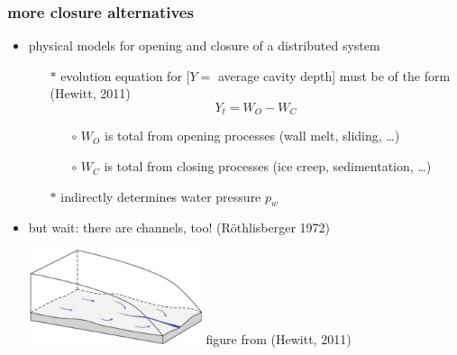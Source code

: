 \documentclass[hide notes,intlimits]{beamer}
\begin{document}
\begin{frame}
  \frametitle{more closure alternatives}

      \begin{itemize}
      \item physical models for opening and closure of a distributed system
        \begin{itemize}
        \item[$\ast$]  evolution equation for [$Y=$ average cavity depth] must be of the form (Hewitt, 2011)
        $$Y_t = W_O - W_C$$
          \begin{itemize}
          \vspace{-4mm}
          \item[$\circ$] $W_O$ is total from opening processes (wall melt, sliding, \dots)
          \item[$\circ$] $W_C$ is total from closing processes (ice creep, sedimentation, \dots)
          \end{itemize}
        \item[$\ast$] indirectly determines water pressure $p_w$
        \end{itemize}
      
      \bigskip
      \item but wait: there are channels, too! (R\"othlisberger 1972)

\begin{center}
\medskip
\includegraphics[width=0.4\textwidth]{figs/hewitt-cartoon} \tiny figure from (Hewitt, 2011)
\medskip
\end{center}
    \end{itemize}
\end{frame}
\end{document}
